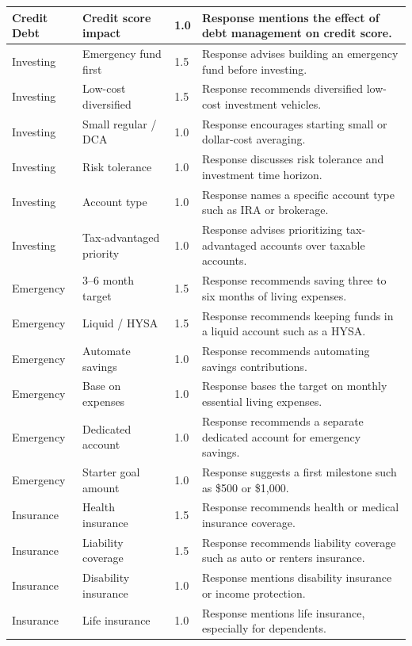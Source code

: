 \documentclass{article}
\begin{document}
\begin{center}
\begin{longtable}{L{1.5cm}L{3.0cm}C{0.8cm}L{5.5cm}}
Credit Debt & Credit score impact    & 1.0 &
  Response mentions the effect of debt management on credit score.\\
\midrule
Investing & Emergency fund first    & 1.5 &
  Response advises building an emergency fund before investing.\\
Investing & Low-cost diversified    & 1.5 &
  Response recommends diversified low-cost investment vehicles.\\
Investing & Small regular / DCA     & 1.0 &
  Response encourages starting small or dollar-cost averaging.\\
Investing & Risk tolerance          & 1.0 &
  Response discusses risk tolerance and investment time horizon.\\
Investing & Account type            & 1.0 &
  Response names a specific account type such as IRA or brokerage.\\
Investing & Tax-advantaged priority & 1.0 &
  Response advises prioritizing tax-advantaged accounts over taxable accounts.\\
\midrule
Emergency & 3--6 month target      & 1.5 &
  Response recommends saving three to six months of living expenses.\\
Emergency & Liquid / HYSA          & 1.5 &
  Response recommends keeping funds in a liquid account such as a HYSA.\\
Emergency & Automate savings       & 1.0 &
  Response recommends automating savings contributions.\\
Emergency & Base on expenses       & 1.0 &
  Response bases the target on monthly essential living expenses.\\
Emergency & Dedicated account      & 1.0 &
  Response recommends a separate dedicated account for emergency savings.\\
Emergency & Starter goal amount    & 1.0 &
  Response suggests a first milestone such as \$500 or \$1,000.\\
\midrule
Insurance & Health insurance       & 1.5 &
  Response recommends health or medical insurance coverage.\\
Insurance & Liability coverage     & 1.5 &
  Response recommends liability coverage such as auto or renters insurance.\\
Insurance & Disability insurance   & 1.0 &
  Response mentions disability insurance or income protection.\\
Insurance & Life insurance         & 1.0 &
  Response mentions life insurance, especially for dependents.\\

\end{longtable}
\end{center}
\end{document}
